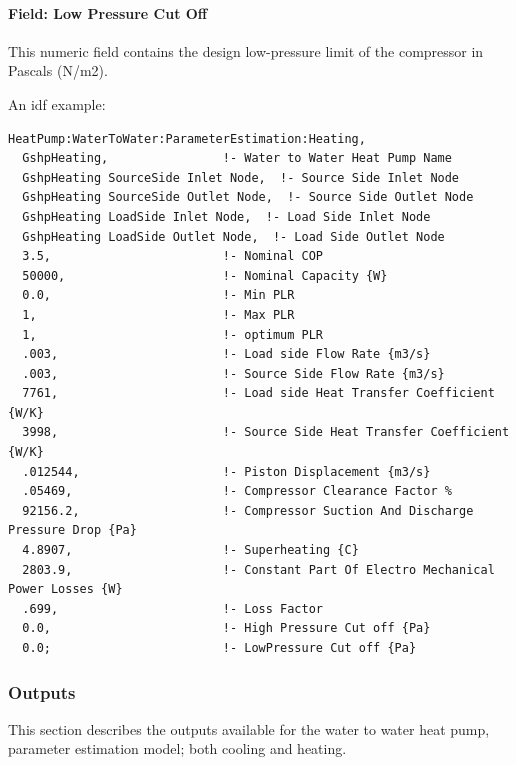 \paragraph{Field: Low Pressure Cut Off}\label{field-low-pressure-cut-off-1}

This numeric field contains the design low-pressure limit of the compressor in Pascals (N/m2).

An idf example:

\begin{lstlisting}
HeatPump:WaterToWater:ParameterEstimation:Heating,
  GshpHeating,                !- Water to Water Heat Pump Name
  GshpHeating SourceSide Inlet Node,  !- Source Side Inlet Node
  GshpHeating SourceSide Outlet Node,  !- Source Side Outlet Node
  GshpHeating LoadSide Inlet Node,  !- Load Side Inlet Node
  GshpHeating LoadSide Outlet Node,  !- Load Side Outlet Node
  3.5,                        !- Nominal COP
  50000,                      !- Nominal Capacity {W}
  0.0,                        !- Min PLR
  1,                          !- Max PLR
  1,                          !- optimum PLR
  .003,                       !- Load side Flow Rate {m3/s}
  .003,                       !- Source Side Flow Rate {m3/s}
  7761,                       !- Load side Heat Transfer Coefficient {W/K}
  3998,                       !- Source Side Heat Transfer Coefficient {W/K}
  .012544,                    !- Piston Displacement {m3/s}
  .05469,                     !- Compressor Clearance Factor %
  92156.2,                    !- Compressor Suction And Discharge Pressure Drop {Pa}
  4.8907,                     !- Superheating {C}
  2803.9,                     !- Constant Part Of Electro Mechanical Power Losses {W}
  .699,                       !- Loss Factor
  0.0,                        !- High Pressure Cut off {Pa}
  0.0;                        !- LowPressure Cut off {Pa}
\end{lstlisting}

\subsubsection{Outputs}\label{outputs-13-003}

This section describes the outputs available for the water to water heat pump, parameter estimation model; both cooling and heating.


